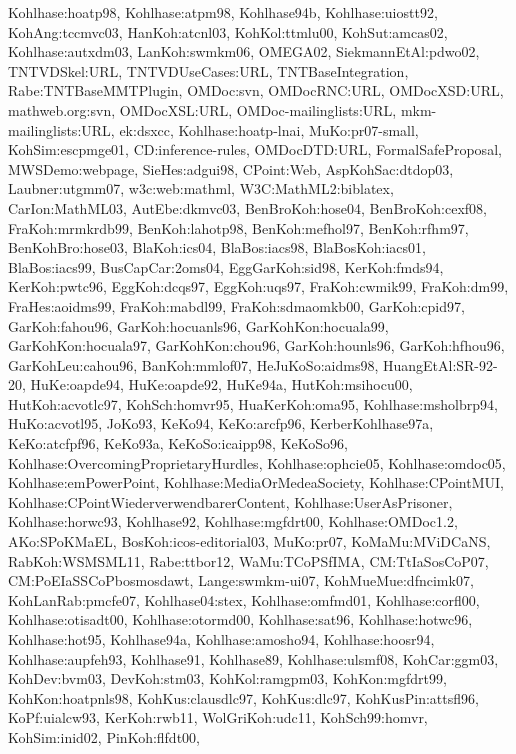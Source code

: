 {Kohlhase:hoatp98,%
Kohlhase:atpm98,%
Kohlhase94b,%
Kohlhase:uiostt92,%
KohAng:tccmvc03,%
HanKoh:atcnl03,%
KohKol:ttmlu00,%
KohSut:amcas02,%
Kohlhase:autxdm03,%
LanKoh:swmkm06,%
OMEGA02,%
SiekmannEtAl:pdwo02,%
TNTVDSkel:URL,%
TNTVDUseCases:URL,%
TNTBaseIntegration,%
Rabe:TNTBaseMMTPlugin,%
OMDoc:svn,%
OMDocRNC:URL,%
OMDocXSD:URL,%
mathweb.org:svn,%
OMDocXSL:URL,%
OMDoc-mailinglists:URL,%
mkm-mailinglists:URL,%
ek:dsxcc,%
Kohlhase:hoatp-lnai,%
MuKo:pr07-small,%
KohSim:escpmge01,%
CD:inference-rules,%
OMDocDTD:URL,%
FormalSafeProposal,%
MWSDemo:webpage,%
SieHes:adgui98,%
CPoint:Web,%
AspKohSac:dtdop03,%
Laubner:utgmm07,%
w3c:web:mathml,%
W3C:MathML2:biblatex,%
CarIon:MathML03,%
AutEbe:dkmvc03,%
BenBroKoh:hose04,%
BenBroKoh:cexf08,%
FraKoh:mrmkrdb99,%
BenKoh:lahotp98,%
BenKoh:mefhol97,%
BenKoh:rfhm97,%
BenKohBro:hose03,%
BlaKoh:ics04,%
BlaBos:iacs98,%
BlaBosKoh:iacs01,%
BlaBos:iacs99,%
BusCapCar:2oms04,%
EggGarKoh:sid98,%
KerKoh:fmds94,%
KerKoh:pwtc96,%
EggKoh:dcqs97,%
EggKoh:uqs97,%
FraKoh:cwmik99,%
FraKoh:dm99,%
FraHes:aoidms99,%
FraKoh:mabdl99,%
FraKoh:sdmaomkb00,%
GarKoh:cpid97,%
GarKoh:fahou96,%
GarKoh:hocuanls96,%
GarKohKon:hocuala99,%
GarKohKon:hocuala97,%
GarKohKon:chou96,%
GarKoh:hounls96,%
GarKoh:hfhou96,%
GarKohLeu:cahou96,%
BanKoh:mmlof07,%
HeJuKoSo:aidms98,%
HuangEtAl:SR-92-20,%
HuKe:oapde94,%
HuKe:oapde92,%
HuKe94a,%
HutKoh:msihocu00,%
HutKoh:acvotlc97,%
KohSch:homvr95,%
HuaKerKoh:oma95,%
Kohlhase:msholbrp94,%
HuKo:acvotl95,%
JoKo93,%
KeKo94,%
KeKo:arcfp96,%
KerberKohlhase97a,%
KeKo:atcfpf96,%
KeKo93a,%
KeKoSo:icaipp98,%
KeKoSo96,%
Kohlhase:OvercomingProprietaryHurdles,%
Kohlhase:ophcie05,%
Kohlhase:omdoc05,%
Kohlhase:emPowerPoint,%
Kohlhase:MediaOrMedeaSociety,%
Kohlhase:CPointMUI,%
Kohlhase:CPointWiederverwendbarerContent,%
Kohlhase:UserAsPrisoner,%
Kohlhase:horwc93,%
Kohlhase92,%
Kohlhase:mgfdrt00,%
Kohlhase:OMDoc1.2,%
AKo:SPoKMaEL,%
BosKoh:icos-editorial03,%
MuKo:pr07,%
KoMaMu:MViDCaNS,%
RabKoh:WSMSML11,%
Rabe:ttbor12,%
WaMu:TCoPSfIMA,%
CM:TtIaSosCoP07,%
CM:PoEIaSSCoPbosmosdawt,%
Lange:swmkm-ui07,%
KohMueMue:dfncimk07,%
KohLanRab:pmcfe07,%
Kohlhase04:stex,%
Kohlhase:omfmd01,%
Kohlhase:corfl00,%
Kohlhase:otisadt00,%
Kohlhase:otormd00,%
Kohlhase:sat96,%
Kohlhase:hotwc96,%
Kohlhase:hot95,%
Kohlhase94a,%
Kohlhase:amosho94,%
Kohlhase:hoosr94,%
Kohlhase:aupfeh93,%
Kohlhase91,%
Kohlhase89,%
Kohlhase:ulsmf08,%
KohCar:ggm03,%
KohDev:bvm03,%
DevKoh:stm03,%
KohKol:ramgpm03,%
KohKon:mgfdrt99,%
KohKon:hoatpnls98,%
KohKus:clausdlc97,%
KohKus:dlc97,%
KohKusPin:attsfl96,%
KoPf:uialcw93,%
KerKoh:rwb11,%
WolGriKoh:udc11,%
KohSch99:homvr,%
KohSim:inid02,%
PinKoh:flfdt00,%
}
